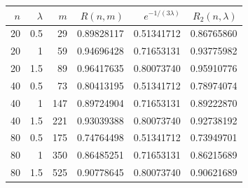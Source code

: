 \begin{tabular}{rrrrrr}
\hline
$n$ & $\lambda$ & $m$ & $R(n,m)$ & $e^{-1/(3\lambda)}$ & $R_2(n,\lambda)$ \\
\hline
20 & 0.5 & 29 & 0.89828117 & 0.51341712 & 0.86765860 \\
20 & 1 & 59 & 0.94696428 & 0.71653131 & 0.93775982 \\
20 & 1.5 & 89 & 0.96417635 & 0.80073740 & 0.95910776 \\
40 & 0.5 & 73 & 0.80413195 & 0.51341712 & 0.78974074 \\
40 & 1 & 147 & 0.89724904 & 0.71653131 & 0.89222870 \\
40 & 1.5 & 221 & 0.93039388 & 0.80073740 & 0.92738192 \\
80 & 0.5 & 175 & 0.74764498 & 0.51341712 & 0.73949701 \\
80 & 1 & 350 & 0.86485251 & 0.71653131 & 0.86215689 \\
80 & 1.5 & 525 & 0.90778645 & 0.80073740 & 0.90621689 \\
\hline
\end{tabular}
